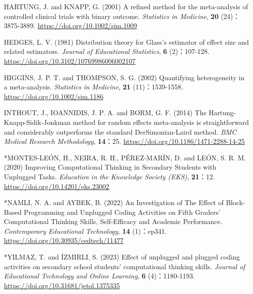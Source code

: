 \documentclass[
  lualatex, ja=standard, paper={182mm,257mm}, twocolumn, fontsize=8.5pt, baselineskip=13.5pt,
  line_length=24zw, column_gap=6.1mm, number_of_lines=45, head_space=24.5mm, gutter=16.25mm
]{jlreq}
\begin{document}
{\par\noindent{}\zw{} HARTUNG, J. and KNAPP, G. (2001) A refined method for the meta-analysis of controlled clinical trials with binary outcome. \textit{Statistics in Medicine}, \textbf{20} (24)：3875-3889. \url{https://doi.org/10.1002/sim.1009}\par
\par\noindent{}\zw{} HEDGES, L. V. (1981) Distribution theory for Glass's estimator of effect size and related estimators. \textit{Journal of Educational Statistics}, \textbf{6} (2)：107-128. \url{https://doi.org/10.3102/10769986006002107}\par
\par\noindent{}\zw{} HIGGINS, J. P. T. and THOMPSON, S. G. (2002) Quantifying heterogeneity in a meta-analysis. \textit{Statistics in Medicine}, \textbf{21} (11)：1539-1558. \url{https://doi.org/10.1002/sim.1186}\par
\par\noindent{}\zw{} INTHOUT, J., IOANNIDIS, J. P. A. and BORM, G. F. (2014) The Hartung-Knapp-Sidik-Jonkman method for random effects meta-analysis is straightforward and considerably outperforms the standard DerSimonian-Laird method. \textit{BMC Medical Research Methodology}, \textbf{14}：25. \url{https://doi.org/10.1186/1471-2288-14-25}\par
\par\noindent{}\zw{} *MONTES-LEÓN, H., NEIRA, R. H., PÉREZ-MARÍN, D. and LEÓN, S. R. M. (2020) Improving Computational Thinking in Secondary Students with Unplugged Tasks. \textit{Education in the Knowledge Society (EKS)}, \textbf{21}：12. \url{https://doi.org/10.14201/eks.23002}\par
\par\noindent{}\zw{} *NAMLI, N. A. and AYBEK, B. (2022) An Investigation of The Effect of Block-Based Programming and Unplugged Coding Activities on Fifth Graders’ Computational Thinking Skills, Self-Efficacy and Academic Performance. \textit{Contemporary Educational Technology}, \textbf{14} (1)：ep341. \url{https://doi.org/10.30935/cedtech/11477}\par
\par\noindent{}\zw{} *YILMAZ, T. and İZMIRLI, S. (2023) Effect of unplugged and plugged coding activities on secondary school students’ computational thinking skills. \textit{Journal of Educational Technology and Online Learning}, \textbf{6} (4)：1180-1193. \url{https://doi.org/10.31681/jetol.1375335}\par
}
\end{document}
